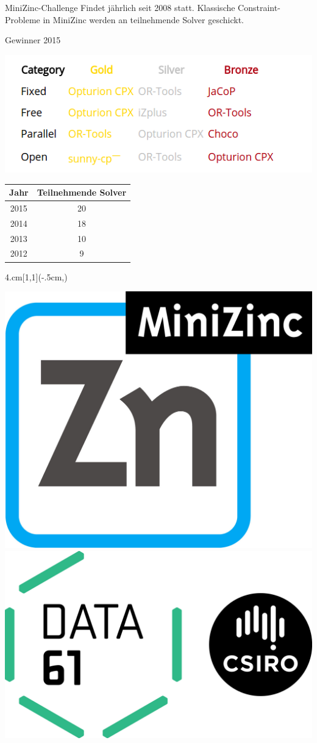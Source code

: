 \begin{frame}{MiniZinc-Challenge}
Findet jährlich seit 2008 statt. Klassische Constraint-Probleme in MiniZinc werden an teilnehmende Solver geschickt.

\begin{center}
Gewinner 2015

\includegraphics[width=.5\textwidth]{img/ergeb2015.png}


\end{center}
\begin{tabular}{|c|c|}
\hline 
Jahr & Teilnehmende Solver \\ 
\hline 
2015 & 20 \\ 
\hline 
2014 & 18 \\ 
\hline 
2013 & 10 \\ 
\hline 
2012 & 9 \\ 
\hline 
\end{tabular} 

\begin{textblock*}{4.cm}[1,1](\textwidth-.5cm,\textheight-1.03cm)

\includegraphics[width=.4\textwidth]{img/MiniZn_logo.jpg}
\hfill
\includegraphics[width=.4\textwidth]{img/data61.jpg} 


\end{textblock*}
\end{frame}